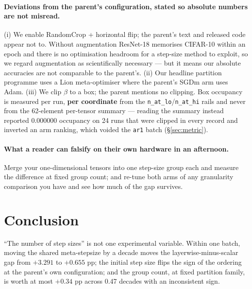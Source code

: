 \documentclass[10pt,letterpaper]{article}
\newcommand{\arm}[1]{\texttt{#1}}
\begin{document}
\paragraph{Deviations from the parent's configuration, stated so absolute numbers are not misread.}
(i) We enable RandomCrop + horizontal flip; the parent's text and released code appear not to.
Without augmentation ResNet-18 memorises CIFAR-10 within an epoch and there is no optimisation
headroom for a step-size method to exploit, so we regard augmentation as scientifically necessary
--- but it means our absolute accuracies are not comparable to the parent's. (ii) Our headline
partition programme uses a Lion meta-optimiser where the parent's SGDm arm uses Adam. (iii) We clip
$\beta$ to a box; the parent mentions no clipping. Box occupancy is measured per run, \textbf{per
coordinate} from the \texttt{n\_at\_lo}/\texttt{n\_at\_hi} rails and never from the 62-element
per-tensor summary --- reading the summary instead reported 0.000000 occupancy on 24 runs that were
clipped in every record and inverted an arm ranking, which voided the \arm{ar1} batch
(\S\ref{sec:metric}).

\paragraph{What a reader can falsify on their own hardware in an afternoon.}
Merge your one-dimensional tensors into one step-size group each and measure the difference at
fixed group count; and re-tune both arms of any granularity comparison you have and see how much of
the gap survives.

\section{Conclusion}
\label{sec:conclusion}

``The number of step sizes'' is not one experimental variable. Within one batch, moving the shared
meta-stepsize by a decade moves the layerwise-minus-scalar gap from $+3.291$ to $+0.655$ pp; the
initial step size flips the sign of the ordering at the parent's own configuration; and the group
count, at fixed partition family, is worth at most $+0.34$ pp across 0.47 decades with an
inconsistent sign.
\end{document}
